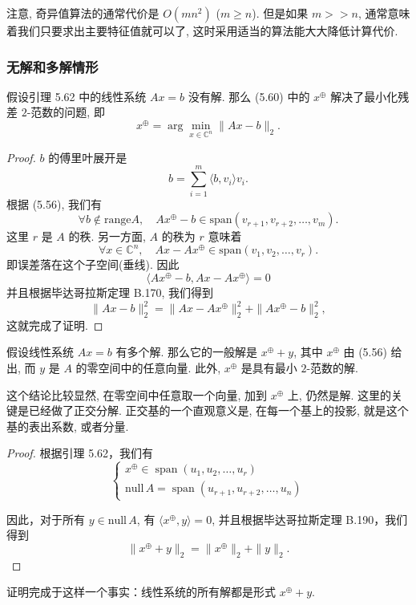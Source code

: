 \documentclass[a4paper]{ctexart}
\newcommand{\hl}[1]
{\noindent {\bf {#1}}}
\begin{document}
{注意, 奇异值算法的通常代价是 $O(mn^2)$ ($m \geq n$). 但是如果 $m >> n$, 
通常意味着我们只要求出主要特征值就可以了, 这时采用适当的算法能大大降低计算代价. 

\subsubsection{无解和多解情形}

\hl{定理5.63} 假设引理 5.62 中的线性系统 $Ax = b$ 没有解. 那么 (5.60) 
中的 $x^{\oplus}$ 解决了最小化残差 $2$-范数的问题, 即
\[ 
x^{\oplus} = \arg\min_{x \in \mathbb{C}^n} \|Ax - b\|_2. 
\]

\begin{proof}
$b$ 的傅里叶展开是
\[ 
b = \sum_{i=1}^{m} \langle b, v_i \rangle v_i. 
\]
根据 (5.56), 我们有
\[ 
\forall b \notin \text{range} A, \quad 
Ax^{\oplus} - b \in \text{span}(v_{r+1}, v_{r+2}, \ldots, v_m). 
\]
这里 $r$ 是 $A$ 的秩. 另一方面, $A$ 的秩为 $r$ 意味着
\[ 
\forall x \in \mathbb{C}^n, \quad 
Ax - Ax^{\oplus} \in \text{span}(v_1, v_2, \ldots, v_r). 
\]
即误差落在这个子空间(垂线). 因此
\[ 
\langle Ax^{\oplus} - b, Ax - Ax^{\oplus} \rangle = 0 
\]
并且根据毕达哥拉斯定理 B.170, 我们得到
\[
\|Ax - b\|_2^2 = \|Ax - Ax^{\oplus}\|_2^2 + \|Ax^{\oplus} - b\|_2^2, 
\]
这就完成了证明.
\end{proof}

\hl{定理5.64} 
假设线性系统 $Ax = b$ 有多个解. 那么它的一般解是 $x^{\oplus} + y$, 
其中 $x^{\oplus}$ 由 (5.56) 给出, 而 $y$ 是 $A$ 的零空间中的任意向量. 此外, $x^{\oplus}$ 是具有最小 $2$-范数的解.

这个结论比较显然, 在零空间中任意取一个向量, 加到 $x^{\oplus}$ 上, 仍然是解. 这里的关键是已经做了正交分解. 
正交基的一个直观意义是, 在每一个基上的投影, 就是这个基的表出系数, 或者分量. 

\begin{proof}
根据引理 5.62，我们有
\[
  \left\{
  \begin{array}{l}
  x^{\oplus} \in \operatorname{span}(u_1, u_2, \ldots, u_r) \\
  \text{null} \, A = \operatorname{span}(u_{r+1}, u_{r+2}, \ldots, u_n)
  \end{array}
  \right.
\]

因此，对于所有 \( y \in \text{null} \, A \), 有 \(\langle x^{\oplus}, y \rangle = 0\), 并且根据毕达哥拉斯定理 B.190，我们得到
\[
  \|x^{\oplus} + y\|_2 = \|x^{\oplus}\|_2 + \|y\|_2.
\]
\end{proof}

证明完成于这样一个事实：线性系统的所有解都是形式 \( x^{\oplus} + y \).

}
\end{document}
